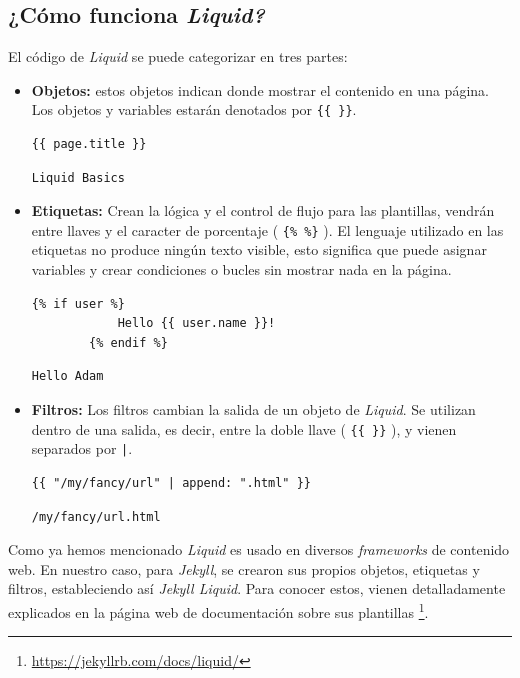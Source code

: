 \subsection*{¿Cómo funciona \emph{Liquid?}}
El código de  \emph{Liquid} se puede categorizar en tres partes:
\begin{itemize}
    \item \textbf{Objetos:} estos objetos indican donde mostrar el contenido en una página. Los objetos y variables estarán denotados por \texttt{\{\{ \}\}}.
    \begin{lstlisting}[caption=Input. Objetos]
    {{ page.title }}
    \end{lstlisting}
    \begin{lstlisting}[caption=Output. Objetos]
    Liquid Basics 
    \end{lstlisting}
    \item \textbf{Etiquetas:} Crean la lógica y el control de flujo para las plantillas, vendrán entre llaves y el caracter de porcentaje ( \texttt{\{\%  \%\}} ). El lenguaje utilizado en las etiquetas no produce ningún texto visible, esto significa que puede asignar variables y crear condiciones o bucles sin mostrar nada en la página.
    \begin{lstlisting}[caption=Input. Etiquetas]
        {% if user %}
            Hello {{ user.name }}!
        {% endif %}
    \end{lstlisting}
    \begin{lstlisting}[caption=Output. Etiquetas]
        Hello Adam
    \end{lstlisting}
    \item \textbf{Filtros:} Los filtros cambian la salida de un objeto de \emph{Liquid}. Se utilizan dentro de una salida, es decir, entre la doble llave ( \texttt{\{\{ \}\}} ), y vienen separados por \texttt{|}.
    \begin{lstlisting}[caption=Input. Filtros]
    {{ "/my/fancy/url" | append: ".html" }}
    \end{lstlisting}
    \begin{lstlisting}[caption=Output. Filtros]
    /my/fancy/url.html
    \end{lstlisting}
\end{itemize}

Como ya hemos mencionado \emph{Liquid} es usado en diversos \emph{frameworks} de contenido web. En nuestro caso, para \emph{Jekyll}, se crearon sus propios objetos, etiquetas y filtros, estableciendo así \emph{Jekyll Liquid}. Para conocer estos, vienen detalladamente explicados  en la página web de  documentación sobre sus plantillas \footnote{\url{https://jekyllrb.com/docs/liquid/}}.

